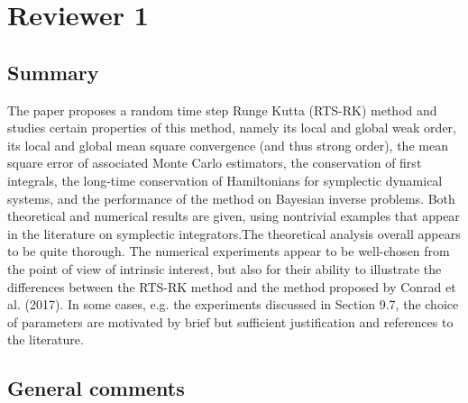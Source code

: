 \documentclass{article}
\begin{document}
	\section*{Reviewer 1}
	\subsection*{Summary}
	The paper proposes a random time step Runge Kutta (RTS-RK) method and studies certain properties of this method, namely its local and global weak order, its local and global mean square convergence (and thus strong order), the mean square error of associated Monte Carlo estimators, the conservation of first integrals, the long-time conservation of Hamiltonians for symplectic dynamical systems, and the performance of the method on Bayesian inverse problems. Both theoretical and numerical results are given, using nontrivial examples that appear in the literature on symplectic integrators.The theoretical analysis overall appears to be quite thorough. The numerical experiments appear to be well-chosen from the point of view of intrinsic interest, but also for their ability to illustrate the differences between the RTS-RK method and the method proposed by Conrad et al. (2017). In some cases, e.g. the experiments discussed in Section 9.7, the choice of parameters are motivated by brief but sufficient justification and references to the literature. 
	
	\subsection*{General comments}
	
\end{document}
